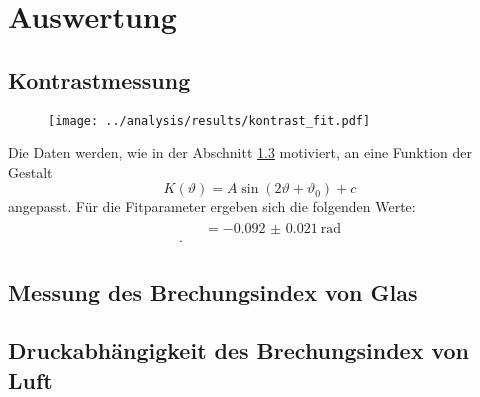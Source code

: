 \section{Auswertung}


\subsection{Kontrastmessung}


\begin{figure}
    \centering
    \texttt{[image: ../analysis/results/kontrast\_fit.pdf]}
\end{figure}

Die Daten werden, wie in der Abschnitt \ref{} motiviert, an eine Funktion der Gestalt
\begin{equation}
    K(\vartheta) = A \sin \left(2 \vartheta + \vartheta_0 \right) + c 
\end{equation}
angepasst. Für die Fitparameter ergeben sich die folgenden Werte:
\begin{align}
    \begin{aligned}
     \quad  &  = \SI{-0.092(21)}{\radian} \\ 
    .
    \end{aligned}
\end{align}



\subsection{Messung des Brechungsindex von Glas}




\subsection{Druckabhängigkeit des Brechungsindex von Luft}


